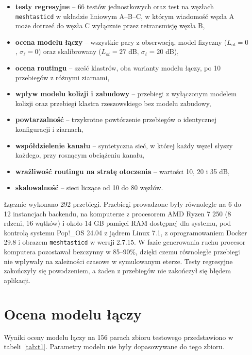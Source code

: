 \begin{itemize}
\item \textbf{testy regresyjne} -- 66 testów jednostkowych oraz test na węzłach \texttt{meshtasticd} w układzie liniowym A--B--C, w którym wiadomość węzła A może dotrzeć do węzła C wyłącznie przez retransmisję węzła B,
\item \textbf{ocena modelu łączy} -- wszystkie pary z obserwacją, model fizyczny (\(L_{ot} = 0\), \(\sigma_{\ell} = 0\)) oraz skalibrowany (\(L_{ot} = 27\) dB, \(\sigma_{\ell} = 20\) dB),
\item \textbf{ocena routingu} -- sześć klastrów, oba warianty modelu łączy, po 10 przebiegów z różnymi ziarnami,
\item \textbf{wpływ modelu kolizji i zabudowy} -- przebiegi z wyłączonym modelem kolizji oraz przebiegi klastra rzeszowskiego bez modelu zabudowy,
\item \textbf{powtarzalność} -- trzykrotne powtórzenie przebiegów o identycznej konfiguracji i ziarnach,
\item \textbf{współdzielenie kanału} -- syntetyczna sieć, w której każdy węzeł słyszy każdego, przy rosnącym obciążeniu kanału,
\item \textbf{wrażliwość routingu na stratę otoczenia} -- wartości 10, 20 i 35 dB,
\item \textbf{skalowalność} -- sieci liczące od 10 do 80 węzłów.
\end{itemize}

Łącznie wykonano 292 przebiegi. Przebiegi prowadzone były równolegle na 6 do 12 instancjach backendu, na komputerze z procesorem AMD Ryzen 7 250 (8 rdzeni, 16 wątków) i około 14 GB pamięci RAM dostępnej dla systemu, pod kontrolą systemu Pop!\_OS 24.04 z jądrem Linux 7.1, z oprogramowaniem Docker 29.8 i obrazem \texttt{meshtasticd} w wersji 2.7.15. W fazie generowania ruchu procesor komputera pozostawał bezczynny w 85--90\%, dzięki czemu równoległe przebiegi nie wpływały na zależności czasowe w symulowanym eterze. Testy regresyjne zakończyły się powodzeniem, a żaden z przebiegów nie zakończył się błędem aplikacji.

\section{Ocena modelu łączy}

Wyniki oceny modelu łączy na 156 parach zbioru testowego przedstawiono w tabeli~\ref{tab:t1}. Parametry modelu nie były dopasowywane do tego zbioru.

